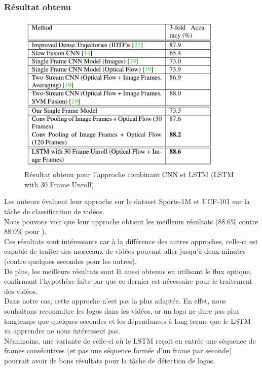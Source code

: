 \documentclass[11pt]{article}
\begin{document}
\subsubsection{Résultat obtenu}
\label{sec:org3a865ac}
\begin{figure}[htbp]
\centering
\includegraphics[width=10cm]{cnn_lstm_res.png}
\caption{Résultat obtenu pour l'approche combinant CNN et LSTM (LSTM with 30 Frame Unroll) \label{cnn_lstm}}
\end{figure}
Les auteurs évaluent leur approche sur le dataset Sports-1M et UCF-101 sur la tâche de classification de vidéos.\\
Nous pouvons voir que leur approche obtient les meilleurs résultats (88.6\% contre 88.0\% pour \cite{DBLP:journals/corr/SimonyanZ14}).\\
Ces résultats sont intéressants car à la différence des autres approches, celle-ci est capable de traiter des morceaux de vidéos pouvant aller jusqu'à deux minutes (contre quelques secondes pour les autres).\\
De plus, les meilleurs résultats sont là aussi obtenus en utilisant le flux optique, confirmant l'hypothèse faite par \cite{DBLP:journals/corr/SimonyanZ14} que ce dernier est nécessaire pour le traitement des vidéos.\\

Dans notre cas, cette approche n'est pas la plus adaptée. En effet, nous souhaitons reconnaitre les logos dans les vidéos, or un logo ne dure pas plus longtemps que quelques secondes et les dépendances à long-terme que le LSTM va apprendre ne nous intéressent pas.\\
Néanmoins, une variante de celle-ci où le LSTM reçoit en entrée une séquence de frames consécutives (et pas une séquence formée d'un frame par seconde) pourrait avoir de bons résultats pour la tâche de détection de logos.\\
\end{document}
